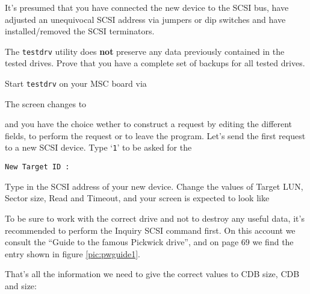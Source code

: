 It's presumed that you have connected the new device to the
SCSI bus, have adjusted an unequivocal SCSI address via
jumpers or dip switches and have
installed\slash removed the SCSI terminators.

\begin{caution}
  The {\tt testdrv} utility does {\bf not} preserve any data previously
  contained in the tested drives. Prove that you have a complete set of backups
  for all tested drives.
\end{caution}

Start {\tt testdrv} on your MSC board via

\medskip
{}
\medskip

The screen changes to



and you have the choice wether to construct a request by editing the different
fields, to perform the request or to leave the program. Let's send the first
request to a new SCSI device.  Type `{\tt 1}' to be asked for the

{\tt New Target ID :}

Type in the SCSI address of your new device. Change the values of Target LUN,
Sector size, Read and Timeout, and your screen is expected to look like



To be sure to work with the correct drive and not to destroy any useful data,
it's recommended to perform the Inquiry SCSI command first. On this account we
consult the ``Guide to the famous Pickwick drive'', and on page 69 we find the
entry shown in figure \ref{pic:pwguide1}.

That's all the information we need to give the correct values to CDB size, CDB
and size:

